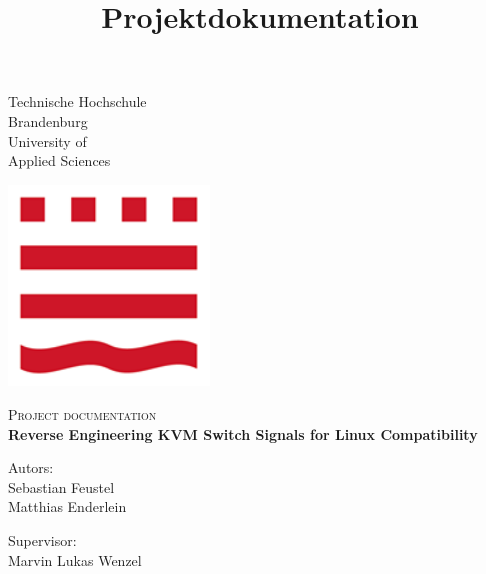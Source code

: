 \title{Projektdokumentation}

\begin{titlepage}
\begin{center}

\begin{minipage}{0.57\textwidth}
\begin{flushleft}\large
Technische Hochschule \\
Brandenburg \\
University of \\
Applied Sciences
\end{flushleft}
\end{minipage}
\hfill
\begin{minipage}{0.42\textwidth}
\begin{flushright}
\begin{center}
\includegraphics[width=0.4\textwidth]{logo.png}\\ 
\end{center}
\end{flushright}
\end{minipage}
\vfill
\vspace*{0.5cm}
\textsc{\large Project documentation }\\[0.5cm]


{ \Huge \bfseries Reverse Engineering KVM Switch Signals for Linux Compatibility\\[0.4cm]}

\vspace*{2.5cm}


\begin{minipage}{0.45\textwidth}
\begin{flushleft} \normalsize 
Autors: \\
Sebastian Feustel\\
Matthias Enderlein
\end{flushleft}
\end{minipage}
\hfill
\begin{minipage}{0.45\textwidth}
\begin{flushright} \normalsize 
\begin{flushleft}
Supervisor: \\
Marvin Lukas Wenzel 
\end{flushleft}
\end{flushright}
\end{minipage}


\end{center}
\end{titlepage}
